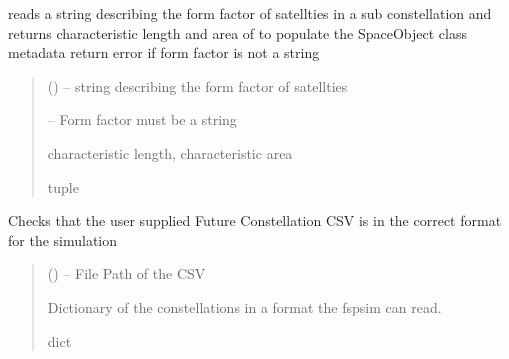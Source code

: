 \documentclass[letterpaper,10pt,english]{sphinxmanual}
\begin{document}
\begin{fulllineitems}
\label{\detokenize{fspsim.utils:fspsim.utils.Formatting.calculate_form_factor}}
\pysigstartsignatures
{}
\pysigstopsignatures
\sphinxAtStartPar
reads a string describing the form factor of satellties in a sub constellation and
returns characteristic length and area of to populate the SpaceObject class metadata
return error if form factor is not a string
\begin{quote}\begin{description}
\sphinxAtStartPar
{} () – string describing the form factor of satellties

\sphinxAtStartPar
{} – Form factor must be a string

\sphinxAtStartPar
characteristic length, characteristic area

\sphinxAtStartPar
tuple

\end{description}\end{quote}

\end{fulllineitems}


\begin{fulllineitems}
\label{\detokenize{fspsim.utils:fspsim.utils.Formatting.future_constellations_csv_handler}}
\pysigstartsignatures
{}
\pysigstopsignatures
\sphinxAtStartPar
Checks that the user supplied Future Constellation CSV is in the correct format for the simulation
\begin{quote}\begin{description}
\sphinxAtStartPar
{} () – File Path of the CSV

\sphinxAtStartPar
Dictionary of the constellations in a format the fspsim can read.

\sphinxAtStartPar
dict

\end{description}\end{quote}

\end{fulllineitems}
\end{document}
